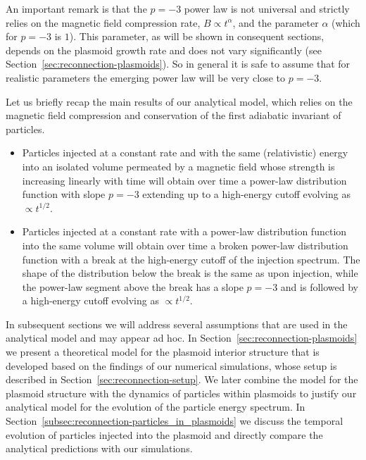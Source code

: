 An important remark is that the $p=-3$ power law is not universal and strictly relies on the magnetic field compression rate, $B\propto t^{\alpha}$, and the parameter $\alpha$ (which for $p=-3$ is $1$). This parameter, as will be shown in consequent sections, depends on the plasmoid growth rate and does not vary significantly (see Section~\ref{sec:reconnection-plasmoids}). So in general it is safe to assume that for realistic parameters the emerging power law will be very close to $p=-3$. 

Let us briefly recap the main results of our analytical model, which relies on the magnetic field compression and conservation of the first adiabatic invariant of particles.
\begin{itemize}
    \item Particles injected at a constant rate and with the same (relativistic) energy into an isolated volume permeated by a magnetic field whose strength is increasing linearly with time will obtain over time a power-law distribution function with slope $p=-3$ extending up to a high-energy cutoff evolving as $\propto t^{1/2}$.
    \item Particles injected at a constant rate with a power-law distribution function into the same volume will obtain over time a broken power-law distribution function with a break at the high-energy cutoff of the injection spectrum. The shape of the distribution below the break is the same as upon injection, while the  power-law segment above the break has a slope $p=-3$ and is followed by a high-energy cutoff evolving as $\propto t^{1/2}$. 
\end{itemize}

In subsequent sections we will address several assumptions that are used in the analytical model and may appear ad hoc. In Section~\ref{sec:reconnection-plasmoids} we present a theoretical model for the plasmoid interior structure that is developed based on the findings of our numerical simulations, whose setup is described in Section~\ref{sec:reconnection-setup}. We later combine the model for the plasmoid structure with the dynamics of particles within plasmoids to justify our analytical model for the evolution of the particle energy spectrum. In Section~\ref{subsec:reconnection-particles_in_plasmoids} we discuss the temporal evolution of particles injected into the plasmoid and directly compare the analytical predictions with our simulations.

%
% 
%
% 

